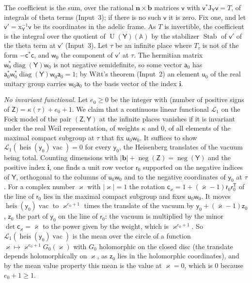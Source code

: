 \documentclass[11pt,a4paper]{article}
\makeatletter
\theoremstyle{plainx}
\theoremstyle{uprightx}
\renewenvironment{proof}[1][Proof]{\par\pushQED{\qed}\normalfont\topsep0pt\partopsep0pt
  \trivlist\item[\hskip\labelsep\itshape #1.]\ignorespaces}{\popQED\endtrivlist\@endpefalse}
\newcommand{\bb}{\mathbf{b}}
\newcommand{\bn}{\mathbf{n}}
\newcommand{\sY}{\mathsf{Y}}
\newcommand{\sZ}{\mathsf{Z}}
\newcommand{\A}{\mathbb{A}}
\newcommand{\U}{\operatorname{U}}
\newcommand{\cL}{\mathcal{L}}
\newcommand{\negc}{\operatorname{neg}}
\makeatother
\begin{document}
\begin{proof}
The coefficient is the sum, over the rational $\bn\times\bb$ matrices $\mathsf{v}$ with
$\mathsf{v}^{*}\mathrm{J}_{\sY}\mathsf{v}=T$, of integrals of theta terms (Input~3); if there is no such
$\mathsf{v}$ it is zero. Fix one, and let $\mathsf{v}'=\mathrm{x}_{\sY}^{-1}\mathsf{v}$ be its coordinates in the
adelic frame. As $T$ is invertible, the coefficient is the integral over the quotient of $\U(\sY)(\A)$ by the
stabilizer $\operatorname{Stab}$ of $\mathsf{v}'$ of the theta term at $\mathsf{v}'$ (Input~3). Let $\tau$ be an
infinite place where $T_\tau$ is not of the form $-\mathsf{c}^{*}\mathsf{c}$, and $\mathsf{w}_0$ the component of $\mathsf{v}'$ at
$\tau$. The hermitian matrix $\mathsf{w}_0^{*}\operatorname{diag}(\sY)\mathsf{w}_0$ is not negative semidefinite, so
some vector $\mathsf{a}_0$ has $\mathsf{a}_0^{*}\mathsf{w}_0^{*}\operatorname{diag}(\sY)\mathsf{w}_0\mathsf{a}_0=1$;
by Witt's theorem (Input~2) an element $\mathsf{u}_0$ of the real unitary group carries
$\mathsf{w}_0\mathsf{a}_0$ to the basis vector of the index $\mathbf{i}$.

\emph{No invariant functional.} Let $e_0\ge0$ be the integer with (number of positive signs of
$\sZ)=\kappa(\tau)+e_0+1$. We claim that a continuous linear functional $\cL_1$ on the Fock model of the pair
$(\sZ,\sY)$ at the infinite places vanishes if it is invariant under the real Weil representation, of weights $\kappa$
and $0$, of all elements of the maximal compact subgroup at $\tau$ that fix $\mathsf{u}_0\mathsf{w}_0$. It suffices
to show $\cL_1(\operatorname{heis}(\mathsf{y}_0)\operatorname{vac})=0$ for every $\mathsf{y}_0$, the Heisenberg
translates of the vacuum being total. Counting dimensions with $|\bb|+\negc(\sZ)=\negc(\sY)$ and the positive index
$\mathbf{i}$, one finds a unit row vector $\mathsf{r}_0$ supported on the negative indices of $\sY$, orthogonal to the
columns of $\mathsf{u}_0\mathsf{w}_0$ and to the negative coordinates of $\mathsf{y}_0$ at $\tau$. For a complex
number $\varkappa$ with $|\varkappa|=1$ the rotation
$\mathsf{c}_{\varkappa}=1+(\bar\varkappa-1)\bar{\mathsf{r}}_0\mathsf{r}_0^{\mathsf T}$ of the line of $\mathsf{r}_0$
lies in the maximal compact subgroup and fixes $\mathsf{u}_0\mathsf{w}_0$. It moves
$\operatorname{heis}(\mathsf{y}_0)\operatorname{vac}$ to $\varkappa^{e_0+1}$ times the translate of the vacuum by
$\mathsf{y}_0+(\bar\varkappa-1)\mathsf{z}_0$, $\mathsf{z}_0$ the part of $\mathsf{y}_0$ on the line of
$\mathsf{r}_0$: the vacuum is multiplied by the minor $\det\mathsf{c}_{\varkappa}=\bar\varkappa$ to the power given
by the weight, which is $\varkappa^{e_0+1}$. So $\cL_1(\operatorname{heis}(\mathsf{y}_0)\operatorname{vac})$ is the
mean over the circle of a function $\varkappa\mapsto\varkappa^{e_0+1}G_0(\varkappa)$ with $G_0$ holomorphic on the
closed disc (the translate depends holomorphically on $\varkappa$, as $\mathsf{z}_0$ lies in the holomorphic
coordinates), and by the mean value property this mean is the value at $\varkappa=0$, which is $0$ because
$e_0+1\ge1$.


\end{proof}
\end{document}
